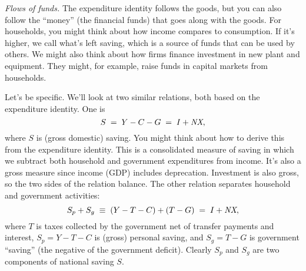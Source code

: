 \documentclass[12pt,letterpaper]{article}
\newcommand{\GNP}{\mbox{\em GNP\/}}
\begin{document}
\begin{comment}
\hline
Gross domestic product                   &10,082.2&           \\ %
\end{tabular}
\end{center}
\end{comment}


{\it Flows of funds.\/}
The expenditure identity follows the goods, but you can also follow
the ``money'' (the financial funds) that goes along with the goods.
For households, you might think about how income compares to consumption.
If it's higher, we call what's left saving, which is a source of funds
that can be used by others.
We might also think about how firms finance investment in new plant and equipment.
They might, for example, raise funds in capital markets from households.


Let's be specific.
We'll look at two similar relations, both based on the expenditure
identity.
One is
$$
                         S \;=\; Y-C-G  \;=\;  I + \mbox{\em NX},
$$
where $S$ is (gross domestic) saving.
You might think about how to derive this from the expenditure identity.
This is a consolidated measure of saving in which we subtract
both household and government expenditures from income.
It's also a gross measure since income (GDP) includes deprecation.
Investment is also gross, so the two sides of the relation balance.
The other relation separates household and government activities:
$$
                         S_p + S_g \;\equiv\; (Y-T-C) + (T-G)
                            \;=\;  I + \mbox{\em NX},
$$
where $T$ is taxes collected by the government net of transfer
payments and interest,
$S_p = Y-T-C$ is (gross) personal saving, and
$S_g = T-G$ is government ``saving''
(the negative of the government deficit).
Clearly $S_p$ and $S_g$ are two components of national saving $S$.
\end{document}
